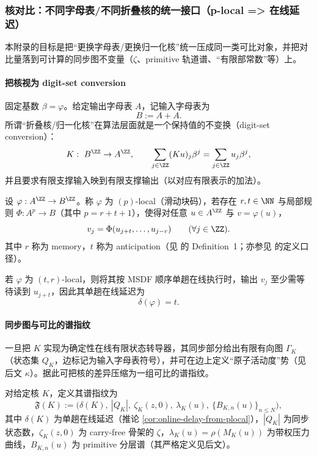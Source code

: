 \subsubsection{核对比：不同字母表/不同折叠核的统一接口（p-local => 在线延迟）}\label{app:sync-kernel-A-compare}
本附录的目标是把“更换字母表/更换归一化核”统一压成同一类可比对象，并把对比量落到可计算的同步图不变量（$\zeta$、primitive 轨道谱、“有限部常数”等）上。

\paragraph{把核视为 digit-set conversion}
固定基数 $\beta=\varphi$。给定输出字母表 $A$，记输入字母表为
\[
B:=A+A.
\]
所谓“折叠核/归一化核”在算法层面就是一个保持值的不变换（digit-set conversion）：
\[
K:\ B^{\ZZ}\to A^{\ZZ},
\qquad
\sum_{j\in\ZZ}(Ku)_j\beta^j=\sum_{j\in\ZZ}u_j\beta^j,
\]
并且要求有限支撑输入映到有限支撑输出（以对应有限表示的加法）。

\begin{definition}\label{def:plocal}
设 $\varphi:A^{\ZZ}\to B^{\ZZ}$。称 $\varphi$ 为 $(p)$-local（滑动块码），若存在 $r,t\in\NN$ 与局部规则 $\Phi:A^{p}\to B$（其中 $p=r+t+1$），使得对任意 $u\in A^{\ZZ}$ 与 $v=\varphi(u)$，
\[
v_j=\Phi(u_{j+t},\dots,u_{j-r})\qquad(\forall j\in\ZZ).
\]
其中 $r$ 称为 memory，$t$ 称为 anticipation（见 \cite{FrougnyHellerPelantovaSvobodovaParallelAlgorithmsSlides} 的 Definition~1；亦参见 \cite{FrougnyPelantovaSvobodova2013MinimalDigitSets} 的定义口径）。
\end{definition}

\begin{corollary}[单趟在线延迟]\label{cor:online-delay-from-plocal}
若 $\varphi$ 为 $(t,r)$-local，则将其按 MSDF 顺序单趟在线执行时，输出 $v_j$ 至少需等待读到 $u_{j+t}$，因此其单趟在线延迟为
\[
\delta(\varphi)=t.
\]
\end{corollary}

\paragraph{同步图与可比的谱指纹}
一旦把 $K$ 实现为确定性在线有限状态转导器，其同步部分给出有限有向图 $\Gamma_K$（状态集 $Q_K$，边标记为输入字母表符号），并可在边上定义“原子活动度”势（见后文 $\kappa$）。据此可把核的差异压缩为一组可比的谱指纹。

\begin{definition}[核的谱指纹（A 路线）]\label{def:kernel-spectral-fingerprint}
对给定核 $K$，定义其谱指纹为
\[
\mathfrak{F}(K):=\bigl(\delta(K),\ |Q_K|,\ \zeta_K(z,0),\ \lambda_K(u),\ \{B_{K,n}(u)\}_{n\le N}\bigr),
\]
其中 $\delta(K)$ 为单趟在线延迟（推论 \ref{cor:online-delay-from-plocal}），$|Q_K|$ 为同步状态数，$\zeta_K(z,0)$ 为 carry-free 骨架的 $\zeta$，$\lambda_K(u)=\rho(M_K(u))$ 为带权压力曲线，$B_{K,n}(u)$ 为 primitive 分层谱（其严格定义见后文）。
\end{definition}

